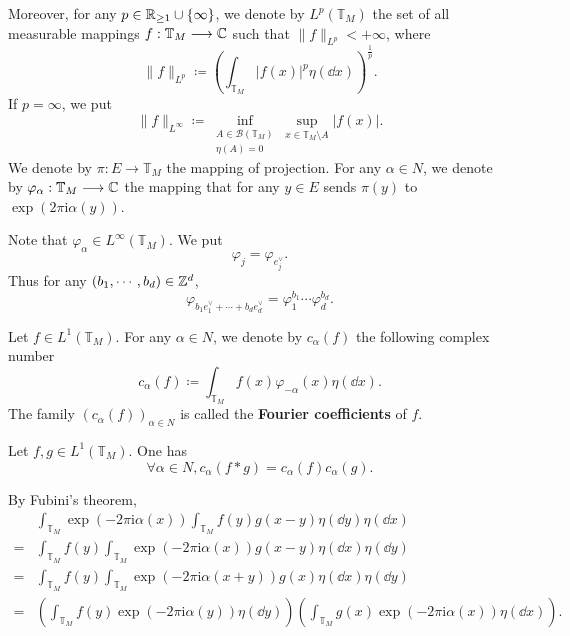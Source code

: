 Moreover, for any $p \in \mathbb{R}_{\ge 1} \cup \{\infty\}$, we denote by $L^p(\mathbb{T}_{M})$ the set of all measurable mappings $f:\mathbb{T}_{M} \longrightarrow \mathbb{C}$ such that $\|f\|_{L^p} < +\infty$, where
$$\|f\|_{L^p} \coloneq \left(\int_{\mathbb{T}_M} |f(x)|^p \eta(\dd x)\right)^{\frac{1}{p}}.$$
If $p = \infty$, we put
$$\|f\|_{L^\infty} \coloneq \inf_{\substack{A \in \mathcal{B}(\mathbb{T}_M)\\ \eta(A) = 0}} \sup_{x \in \mathbb{T}_{M}\setminus A} |f(x)|.$$
We denote by $\pi : E \longrightarrow \mathbb{T}_{M}$ the mapping of projection.
For any $\alpha \in N$, we denote by $\varphi_{\alpha} : \mathbb{T}_M \longrightarrow \mathbb{C}$ the mapping that for any $y \in E$ sends $\pi(y)$ to $\exp(2\pi \mathrm{i} \alpha(y))$.
\begin{figure}[H]
    \centering
\end{figure}
Note that $\varphi_{\alpha} \in L^\infty(\mathbb{T}_{M})$.
We put
$$\varphi_{j} = \varphi_{e^\vee_j}.$$
Thus for any $(b_1,\cdots,b_d) \in \mathbb{Z}^d$,
$$\varphi_{b_1e^\vee_1 + \cdots + b_de^\vee_d} = \varphi_{1}^{b_1} \cdots \varphi_{d}^{b_d}.$$

\begin{definitionenv}
    Let $f \in L^{1}(\mathbb{T}_{M})$.
    For any $\alpha \in N$, we denote by $c_{\alpha}(f)$ the following complex number
    $$c_{\alpha} (f) \coloneq \int_{\mathbb{T}_{M}} f(x) \varphi_{-\alpha}(x) \eta(\dd x).$$
    The family $(c_{\alpha}(f))_{\alpha \in N}$ is called the \textbf{Fourier coefficients} of $f$.
\end{definitionenv}

\begin{propositionenv}
    Let $f,g \in L^1(\mathbb{T}_{M})$.
    One has
    $$\forall \alpha \in N, c_{\alpha} (f * g) = c_{\alpha} (f) c_{\alpha} (g).$$
\end{propositionenv}
\begin{proofenv}
    By Fubini's theorem,
    $$\begin{aligned}
        & \int_{\mathbb{T}_{M}}\exp(-2\pi \mathrm{i} \alpha(x)) \int_{\mathbb{T}_{M}} f(y) g(x - y) \eta(\dd y) \eta(\dd x)\\
        = & \int_{\mathbb{T}_{M}} f(y) \int_{\mathbb{T}_{M}} \exp(-2\pi \mathrm{i} \alpha(x)) g(x - y) \eta(\dd x) \eta(\dd y)\\
        = & \int_{\mathbb{T}_{M}} f(y) \int_{\mathbb{T}_{M}} \exp(-2\pi \mathrm{i} \alpha(x + y)) g(x) \eta(\dd x) \eta(\dd y)\\
        = & \left(\int_{\mathbb{T}_{M}} f(y) \exp(- 2\pi \mathrm{i} \alpha(y)) \eta(\dd y)\right) \left(\int_{\mathbb{T}_{M}} g(x) \exp(-2\pi \mathrm{i} \alpha(x))\eta(\dd x)\right).
    \end{aligned}$$
\end{proofenv}

